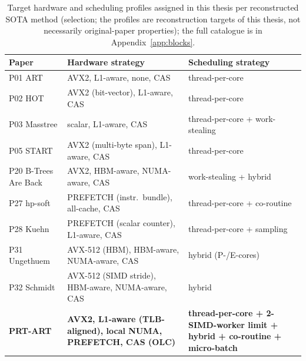 \begin{table}[!htbp]
  \centering\small
  \caption{Target hardware and scheduling profiles assigned in this thesis per reconstructed SOTA method (selection; the profiles are reconstruction targets of this thesis, not necessarily original-paper properties); the full catalogue is in Appendix~\ref{app:blocks}.}\label{tab:hw-sched}
  \begin{tabular}{@{}l p{4.6cm} p{5.6cm}@{}}
    \toprule
    \textbf{Paper} & \textbf{Hardware strategy} & \textbf{Scheduling strategy} \\
    \midrule
    P01 ART & AVX2, L1-aware, none, CAS & thread-per-core \\
    P02 HOT & AVX2 (bit-vector), L1-aware, CAS & thread-per-core \\
    P03 Masstree & scalar, L1-aware, CAS & thread-per-core + work-stealing \\
    P05 START & AVX2 (multi-byte span), L1-aware, CAS & thread-per-core \\
    P20 B-Trees Are Back & AVX2, HBM-aware, NUMA-aware, CAS & work-stealing + hybrid \\
    P27 hp-soft & PREFETCH (instr.\ bundle), all-cache, CAS & thread-per-core + co-routine \\
    P28 Kuehn & PREFETCH (scalar counter), L1-aware, CAS & thread-per-core + sampling \\
    P31 Ungethuem & AVX-512 (HBM), HBM-aware, NUMA-aware, CAS & hybrid (P-/E-cores) \\
    P32 Schmidt & AVX-512 (SIMD stride), HBM-aware, NUMA-aware, CAS & hybrid \\
    \midrule
    \textbf{PRT-ART} & \textbf{AVX2, L1-aware (TLB-aligned), local NUMA, PREFETCH, CAS (OLC)} & \textbf{thread-per-core + 2-SIMD-worker limit + hybrid + co-routine + micro-batch} \\
    \bottomrule
  \end{tabular}
\end{table}

